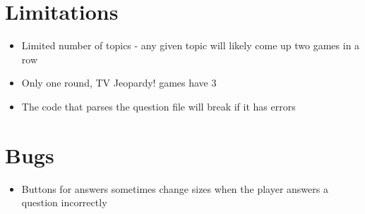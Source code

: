 \documentclass{article}
\begin{document}
\section{Limitations}
\label{sec:limitations}

\begin{itemize}
\item Limited number of topics - any given topic will likely come up
  two games in a row
\item Only one round, TV Jeopardy! games have 3
\item The code that parses the question file will break if it has errors
\end{itemize}

\section{Bugs}
\label{sec:bugs}

\begin{itemize}
\item Buttons for answers sometimes change sizes when the player
  answers a question incorrectly
\end{itemize}
\end{document}
